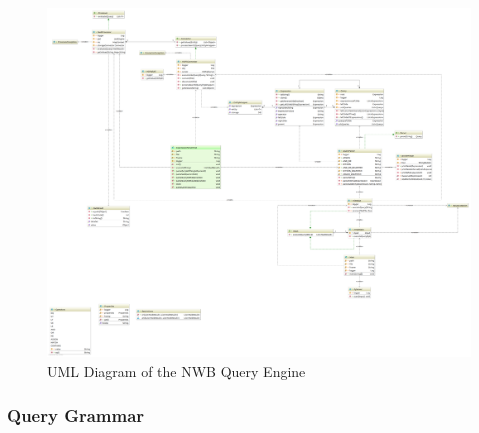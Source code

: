 \documentclass[utf8]{frontiersSCNS} %
\begin{document}
\begin{figure}
  \includegraphics[width=17cm]{diagram}
\caption{UML Diagram of the NWB Query Engine}
\label{fig:diagram}
\end{figure}

\subsubsection{Query Grammar}
\label{Query_Grammar}
\end{document}
